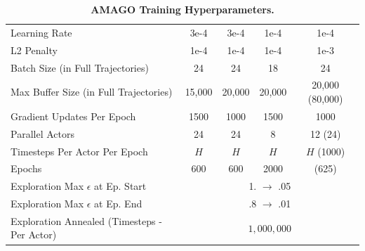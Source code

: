 \begin{table}[h]
{\begin{tabular}{@{}lcccc@{}}
Learning Rate                          & 3e-4                                         & 3e-4                                  & 1e-4                              & 1e-4                               \\
L2 Penalty                             & 1e-4                                         & 1e-4                                  & 1e-4                              & 1e-3                               \\
Batch Size (in Full Trajectories)      & 24                                           & 24                                    & 18                                & 24                                 \\
Max Buffer Size (in Full Trajectories) & 15,000                                       & 20,000                                & 20,000                            & 20,000 (80,000)                             \\
Gradient Updates Per Epoch             & 1500                                         & 1000                                  & 1500                              & 1000                               \\ \midrule
Parallel Actors                        & 24                                           & 24                                    & 8                                 & 12 (24)                                 \\
Timesteps Per Actor Per Epoch           & $H$ & $H$ & $H$ &  $H$ (1000) \\
Epochs                                 & 600                                          & 600                                   & 2000                              & (625)                               \\ 
Exploration Max $\epsilon$ at Ep. Start  & \multicolumn{4}{c}{1. $\rightarrow$ .05} \\
Exploration Max $\epsilon$ at Ep. End & \multicolumn{4}{c}{.8 $\rightarrow$ .01} \\
Exploration Annealed (Timesteps - Per Actor) & \multicolumn{4}{c}{$1,000,000$} \\ \bottomrule
\end{tabular}}
\caption{\textbf{AMAGO Training Hyperparameters.}}
\label{tbl:rl_hparams}
\end{table}

